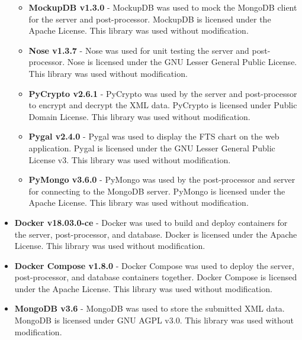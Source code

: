 \begin{itemize}
\begin{itemize}
  \item \textbf{MockupDB v1.3.0} - MockupDB was used to mock the MongoDB client for the server and post-processor. MockupDB is licensed under the Apache License. This library was used without modification.
  \item \textbf{Nose v1.3.7} - Nose was used for unit testing the server and post-processor. Nose is licensed under the GNU Lesser General Public License. This library was used without modification.
  \item \textbf{PyCrypto v2.6.1} - PyCrypto was used by the server and post-processor to encrypt and decrypt the XML data. PyCrypto is licensed under Public Domain License. This library was used without modification.
  \item \textbf{Pygal v2.4.0} - Pygal was used to display the FTS chart on the web application. Pygal is licensed under the GNU Lesser General Public License v3. This library was used without modification.
  \item \textbf{PyMongo v3.6.0} - PyMongo was used by the post-processor and server for connecting to the MongoDB server. PyMongo is licensed under the Apache License. This library was used without modification.
  \end{itemize}
\item \textbf{Docker v18.03.0-ce} - Docker was used to build and deploy containers for the server, post-processor, and database. Docker is licensed under the Apache License. This library was used without modification.
\item \textbf{Docker Compose v1.8.0} - Docker Compose was used to deploy the server, post-processor, and database containers together. Docker Compose is licensed under the Apache License. This library was used without modification.
\item \textbf{MongoDB v3.6} - MongoDB was used to store the submitted XML data. MongoDB is licensed under GNU AGPL v3.0. This library was used without modification.
\end{itemize}
